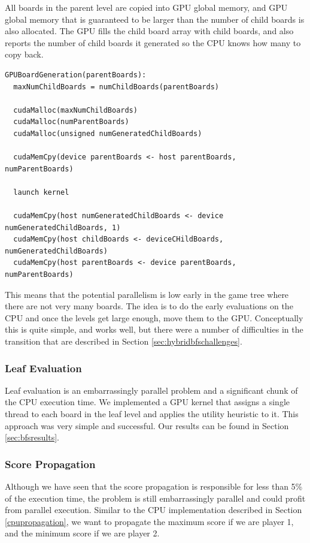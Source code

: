 \documentclass[11pt]{article}
\begin{document}
All boards in the parent level are copied
into GPU global memory, and GPU global memory that is guaranteed to be larger
than the number of child boards is also allocated. The GPU fills the child
board array with child boards, and also reports the number of child boards
it generated so the CPU knows how many to copy back.

\begin{lstlisting}
GPUBoardGeneration(parentBoards):
  maxNumChildBoards = numChildBoards(parentBoards)

  cudaMalloc(maxNumChildBoards)
  cudaMalloc(numParentBoards)
  cudaMalloc(unsigned numGeneratedChildBoards)

  cudaMemCpy(device parentBoards <- host parentBoards, numParentBoards)
  
  launch kernel

  cudaMemCpy(host numGeneratedChildBoards <- device numGeneratedChildBoards, 1)
  cudaMemCpy(host childBoards <- deviceCHildBoards, numGeneratedChildBoards)
  cudaMemCpy(host parentBoards <- device parentBoards, numParentBoards)
\end{lstlisting}

This means that the potential parallelism
is low early in the game tree where there are not very many boards. The idea is
to do the early evaluations on the CPU and once the levels get large enough,
move them to the GPU. Conceptually this is quite simple, and works well, but
there were a number of difficulties in the transition that are described in
Section \ref{sec:hybridbfschallenges}.



\subsubsection{Leaf Evaluation}
\label{sec:GPUleafeval}
Leaf evaluation is an embarrassingly parallel problem and a significant chunk
of the CPU execution time. We implemented a GPU kernel that assigns a single
thread to each board in the leaf level and applies the utility heuristic to it.
This approach was very simple and successful. Our results can be found in
Section \ref{sec:bfsresults}.


\subsubsection{Score Propagation}
\label{sec:GPUscoreprop}

Although we have seen that the score propagation is responsible for less than
5\% of the execution time, the problem is still
embarrassingly parallel and could profit from parallel execution. Similar to the
CPU implementation described in Section \ref{cpupropagation}, we want to
propagate the maximum score if we are player 1, and the minimum score if we are
player 2.
\end{document}
